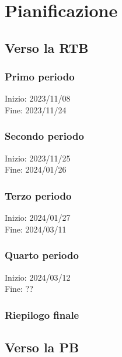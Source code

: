 \pagebreak
\section{Pianificazione}

\subsection{Verso la RTB}

\subsubsection{Primo periodo}
Inizio: 2023/11/08 \\
Fine: 2023/11/24 \\



\subsubsection{Secondo periodo}
Inizio: 2023/11/25 \\
Fine: 2024/01/26 \\



\subsubsection{Terzo periodo}
Inizio: 2024/01/27 \\
Fine: 2024/03/11 \\



\subsubsection{Quarto periodo}
Inizio: 2024/03/12 \\
Fine: ?? \\



\subsubsection{Riepilogo finale}


\subsection{Verso la PB}


